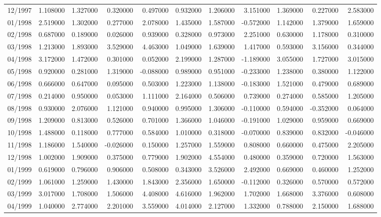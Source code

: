 \begin{tabular}{lrrrrrrrrrr}
12/1997 & 1.108000 & 1.327000 & 0.320000 & 0.497000 & 0.932000 & 1.206000 & 3.151000 & 1.369000 & 0.227000 & 2.583000 \\
01/1998 & 2.519000 & 1.302000 & 0.277000 & 2.078000 & 1.435000 & 1.587000 & -0.572000 & 1.142000 & 1.379000 & 1.659000 \\
02/1998 & 0.687000 & 0.189000 & 0.026000 & 0.939000 & 0.328000 & 0.973000 & 2.251000 & 0.630000 & 1.178000 & 0.310000 \\
03/1998 & 1.213000 & 1.893000 & 3.529000 & 4.463000 & 1.049000 & 1.639000 & 1.417000 & 0.593000 & 3.156000 & 0.344000 \\
04/1998 & 3.172000 & 1.472000 & 0.301000 & 0.052000 & 2.199000 & 1.287000 & -1.189000 & 3.055000 & 1.727000 & 3.015000 \\
05/1998 & 0.920000 & 0.281000 & 1.319000 & -0.088000 & 0.989000 & 0.951000 & -0.233000 & 1.238000 & 0.380000 & 1.122000 \\
06/1998 & 0.666000 & 0.647000 & 0.095000 & 0.503000 & 1.223000 & 1.138000 & -0.183000 & 1.521000 & 0.479000 & 0.689000 \\
07/1998 & 0.214000 & 0.950000 & 0.053000 & 1.111000 & 2.164000 & 0.506000 & 0.739000 & 0.274000 & 0.585000 & 1.205000 \\
08/1998 & 0.930000 & 2.076000 & 1.121000 & 0.940000 & 0.995000 & 1.306000 & -0.110000 & 0.594000 & -0.352000 & 0.064000 \\
09/1998 & 1.209000 & 0.813000 & 0.526000 & 0.701000 & 1.366000 & 1.046000 & -0.191000 & 1.029000 & 0.959000 & 0.669000 \\
10/1998 & 1.488000 & 0.118000 & 0.777000 & 0.584000 & 1.010000 & 0.318000 & -0.070000 & 0.839000 & 0.832000 & -0.046000 \\
11/1998 & 1.186000 & 1.540000 & -0.026000 & 0.150000 & 1.257000 & 1.559000 & 0.808000 & 0.660000 & 0.475000 & 2.205000 \\
12/1998 & 1.002000 & 1.909000 & 0.375000 & 0.779000 & 1.902000 & 4.554000 & 0.480000 & 0.359000 & 0.720000 & 1.563000 \\
01/1999 & 0.619000 & 0.796000 & 0.906000 & 0.508000 & 0.343000 & 3.526000 & 2.492000 & 0.669000 & 0.460000 & 1.252000 \\
02/1999 & 1.061000 & 1.259000 & 1.430000 & 1.843000 & 2.356000 & 1.650000 & -0.112000 & 0.326000 & 0.570000 & 0.572000 \\
03/1999 & 3.017000 & 1.708000 & 1.506000 & 4.408000 & 4.616000 & 1.962000 & 1.702000 & 1.668000 & 3.376000 & 0.608000 \\
04/1999 & 1.040000 & 2.774000 & 2.201000 & 3.559000 & 4.014000 & 2.127000 & 1.332000 & 0.788000 & 2.150000 & 1.688000 \\

\end{tabular}
